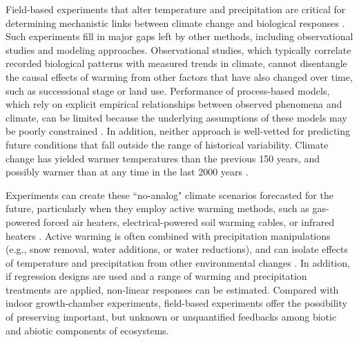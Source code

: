 \documentclass{article}
\begin{document}
\par Field-based experiments that alter temperature and precipitation are critical for determining mechanistic links between climate change and biological responses \citep[e.g.,][]{box1978,williams2007,gelman2014}. Such experiments fill in major gaps left by other methods, including observational studies and modeling approaches. Observational studies, which typically correlate recorded biological patterns with measured trends in climate, cannot disentangle the causal effects of warming from other factors that have also changed over time, such as successional stage or land use. Performance of process-based models, which rely on explicit empirical relationships between observed phenomena and climate, can be limited because the underlying assumptions of these models may be poorly constrained \citep [e.g.,][]{pearson2004,ibanez2006,swab2012,chuine2016}. 
In addition, neither approach is well-vetted for predicting future conditions that fall outside the range of historical variability. Climate change has yielded warmer temperatures than the previous 150 years, and possibly warmer than at any time in the last 2000 years \citep{ohlemuller2006,williams2007,williams2007b,ipcc2013}.  

\par Experiments can create these ``no-analog" climate scenarios forecasted for the future, particularly when they employ active warming methods, such as gas-powered forced air heaters, electrical-powered soil warming cables, or infrared heaters \citep{shaver2000,williams2007b,aronson2009}. Active warming is often combined with precipitation manipulations (e.g., snow removal, water additions, or water reductions), and can isolate effects of temperature and precipitation from other environmental changes \citep [e.g.,][]{price1998,cleland2006,sherry2007,rollinson2012}. In addition, if regression designs are used \citep[e.g.,][]{pelini2011} and a range of warming and precipitation treatments are applied, non-linear responses can be estimated. Compared with indoor growth-chamber experiments, field-based experiments offer the possibility of preserving important, but unknown or unquantified feedbacks among biotic and abiotic components of ecosystems. 
\end{document}
